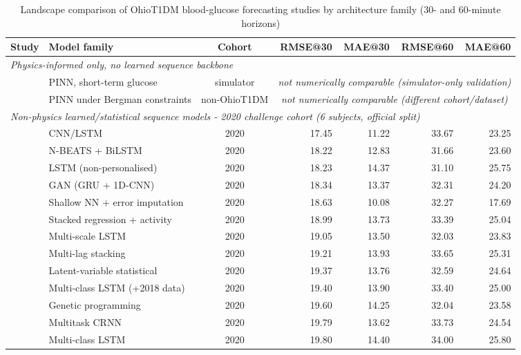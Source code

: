 \documentclass[journal]{IEEEtran}
\begin{document}
\begin{table}[t]
\centering
\caption{Landscape comparison of OhioT1DM blood-glucose forecasting studies by architecture family (30- and 60-minute horizons)}
\label{tab:landscape}
\footnotesize
\begin{tabular}{lp{3.2cm}crrrr}
\toprule
Study & Model family & Cohort & RMSE@30 & MAE@30 & RMSE@60 & MAE@60 \\
\midrule
\multicolumn{7}{l}{\textit{Physics-informed only, no learned sequence backbone}} \\
\cite{ref9} & PINN, short-term glucose & simulator & \multicolumn{4}{c}{\textit{not numerically comparable (simulator-only validation)}} \\
\cite{ref10} & PINN under Bergman constraints & non-OhioT1DM & \multicolumn{4}{c}{\textit{not numerically comparable (different cohort/dataset)}} \\
\midrule
\multicolumn{7}{l}{\textit{Non-physics learned/statistical sequence models - 2020 challenge cohort (6 subjects, official split)}} \\
\cite{ref63} & CNN/LSTM & 2020 & 17.45 & 11.22 & 33.67 & 23.25 \\
\cite{ref62} & N-BEATS + BiLSTM & 2020 & 18.22 & 12.83 & 31.66 & 23.60 \\
\cite{ref61} & LSTM (non-personalised) & 2020 & 18.23 & 14.37 & 31.10 & 25.75 \\
\cite{ref65} & GAN (GRU + 1D-CNN) & 2020 & 18.34 & 13.37 & 32.31 & 24.20 \\
\cite{ref60} & Shallow NN + error imputation & 2020 & 18.63 & 10.08 & 32.27 & 17.69 \\
\cite{ref66} & Stacked regression + activity & 2020 & 18.99 & 13.73 & 33.39 & 25.04 \\
\cite{ref64} & Multi-scale LSTM & 2020 & 19.05 & 13.50 & 32.03 & 23.83 \\
\cite{ref67} & Multi-lag stacking & 2020 & 19.21 & 13.93 & 33.65 & 25.31 \\
\cite{ref68} & Latent-variable statistical & 2020 & 19.37 & 13.76 & 32.59 & 24.64 \\
\cite{ref69} & Multi-class LSTM (+2018 data) & 2020 & 19.40 & 13.90 & 33.40 & 25.00 \\
\cite{ref70} & Genetic programming & 2020 & 19.60 & 14.25 & 32.04 & 23.58 \\
\cite{ref71} & Multitask CRNN & 2020 & 19.79 & 13.62 & 33.73 & 24.54 \\
\cite{ref69} & Multi-class LSTM & 2020 & 19.80 & 14.40 & 34.00 & 25.80 \\

\end{tabular}
\end{table}
\end{document}
